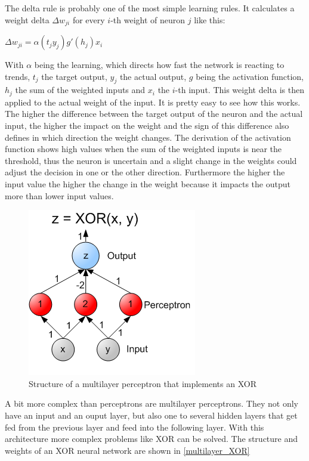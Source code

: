The delta rule is probably one of the most simple learning rules. It calculates a weight delta $\Delta w_{ji}$ for every $i$-th weight of neuron $j$ like this:

\begin{center}
	$\Delta w_{ji} = \alpha (t_j  y_j)g'(h_j)x_i$
\end{center}

With $\alpha$ being the learning, which directs how fast the network is reacting to trends, $t_j$ the target output, $y_j$ the actual output, $g$ being the activation function, $h_j$ the sum of the weighted inputs and $x_i$ the $i$-th input. This weight delta is then applied to the actual weight of the input. It is pretty easy to see how this works. The higher the difference between the target output of the neuron and the actual input, the higher the impact on the weight and the sign of this difference also defines in which direction the weight changes. The derivation of the activation function shows high values when the sum of the weighted inputs is near the threshold, thus the neuron is uncertain and a slight change in the weights could adjust the decision in one or the other direction. Furthermore the higher the input value the higher the change in the weight because it impacts the output more than lower input values.

\begin{figure}[ht]
	\centering
  \includegraphics[scale=0.7]{figures/multilayer_XOR.png}
	\caption[Structure of a multilayer perceptron that implements an XOR]{Structure of a multilayer perceptron that implements an XOR \protect\footnotemark}
	\label{multilayer_XOR}
\end{figure}

A bit more complex than perceptrons are multilayer perceptrons. They not only have an input and an ouput layer, but also one to several hidden layers that get fed from the previous layer and feed into the following layer. With this architecture more complex problems like XOR can be solved. The structure and weights of an XOR neural network are shown in \autoref{multilayer_XOR}

